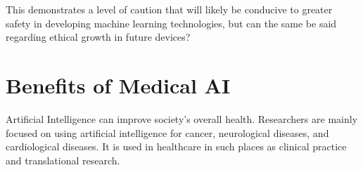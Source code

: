 \documentclass[]{article}
\begin{document}
			This demonstrates a level of caution that will likely be conducive to greater safety in developing machine learning technologies, but can the same be said regarding ethical growth in future devices?

	\section{Benefits of Medical AI}

		Artificial Intelligence can improve society's overall health. Researchers are mainly focused on using artificial intelligence for cancer, neurological diseases, and cardiological diseases. It is used in healthcare in such places as clinical practice and translational research.
\end{document}
